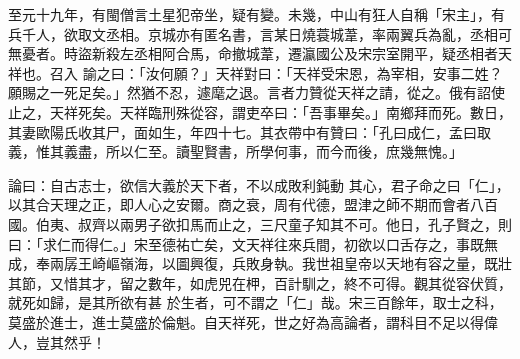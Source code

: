\begin{pinyinscope}
 至元十九年，有閩僧言土星犯帝坐，疑有變。未幾，中山有狂人自稱「宋主」，有兵千人，欲取文丞相。京城亦有匿名書，言某日燒蓑城葦，率兩翼兵為亂，丞相可無憂者。時盜新殺左丞相阿合馬，命撤城葦，遷瀛國公及宋宗室開平，疑丞相者天祥也。召入
 諭之曰：「汝何願？」天祥對曰：「天祥受宋恩，為宰相，安事二姓？願賜之一死足矣。」然猶不忍，遽麾之退。言者力贊從天祥之請，從之。俄有詔使止之，天祥死矣。天祥臨刑殊從容，謂吏卒曰：「吾事畢矣。」南鄉拜而死。數日，其妻歐陽氏收其尸，面如生，年四十七。其衣帶中有贊曰：「孔曰成仁，孟曰取義，惟其義盡，所以仁至。讀聖賢書，所學何事，而今而後，庶幾無愧。」



 論曰：自古志士，欲信大義於天下者，不以成敗利鈍動
 其心，君子命之曰「仁」，以其合天理之正，即人心之安爾。商之衰，周有代德，盟津之師不期而會者八百國。伯夷、叔齊以兩男子欲扣馬而止之，三尺童子知其不可。他日，孔子賢之，則曰：「求仁而得仁。」宋至德祐亡矣，文天祥往來兵間，初欲以口舌存之，事既無成，奉兩孱王崎嶇嶺海，以圖興復，兵敗身執。我世祖皇帝以天地有容之量，既壯其節，又惜其才，留之數年，如虎兕在柙，百計馴之，終不可得。觀其從容伏質，就死如歸，是其所欲有甚
 於生者，可不謂之「仁」哉。宋三百餘年，取士之科，莫盛於進士，進士莫盛於倫魁。自天祥死，世之好為高論者，謂科目不足以得偉人，豈其然乎！



\end{pinyinscope}